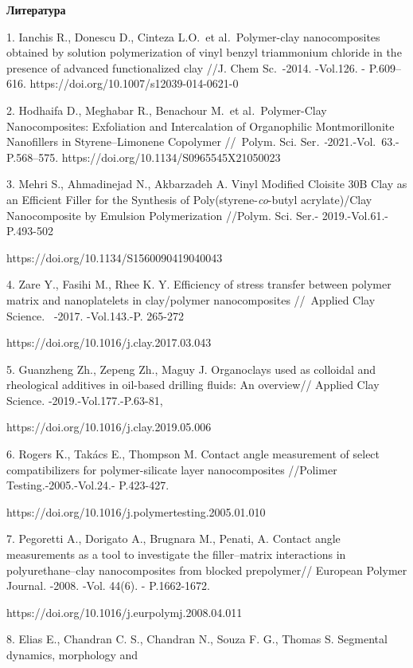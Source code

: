 \begin{center}
{\bfseries Литература}
\end{center}

\begin{noparindent}
1. Ianchis R., Donescu D., Cinteza L.O.~et al\emph{.}~Polymer-clay
nanocomposites obtained by solution polymerization of vinyl benzyl
triammonium chloride in the presence of advanced functionalized clay
//J. Chem Sc.~-2014. -Vol.126. - P.609--616.
https://doi.org/10.1007/s12039-014-0621-0

2. Hodhaifa D., Meghabar R., Benachour M.~et al\emph{.}~Polymer-Clay
Nanocomposites: Exfoliation and Intercalation of Organophilic
Montmorillonite Nanofillers in Styrene--Limonene Copolymer //~Polym.
Sci. Ser\emph{. -}2021.-Vol.~63.- P.568--575.
https://doi.org/10.1134/S0965545X21050023

3. Mehri S., Ahmadinejad N., Akbarzadeh A. Vinyl Modified Cloisite 30B
Clay as an Efficient Filler for the Synthesis of
Poly(styrene-\emph{co}-butyl acrylate)/Clay Nanocomposite by Emulsion
Polymerization //Polym. Sci. Ser.- 2019.-Vol.61.-P.493-502

https://doi.org/10.1134/S1560090419040043

4. Zare Y., Fasihi M., Rhee K. Y. Efficiency of stress transfer between
polymer matrix and nanoplatelets in clay/polymer nanocomposites
//~Applied Clay Science.~ -2017. -Vol.143.-P. 265-272

https://doi.org/10.1016/j.clay.2017.03.043

5. Guanzheng Zh., Zepeng Zh., Maguy J. Organoclays used as colloidal and
rheological additives in oil-based drilling fluids: An overview//
Applied Clay Science. -2019.-Vol.177.-P.63-81,

https://doi.org/10.1016/j.clay.2019.05.006

6. Rogers K., Takács E., Thompson M. Contact angle measurement of select
compatibilizers for polymer-silicate layer nanocomposites //Polimer
Testing.-2005.-Vol.24.- P.423-427.

https://doi.org/10.1016/j.polymertesting.2005.01.010

7. Pegoretti A., Dorigato A., Brugnara M., Penati, A. Contact angle
measurements as a tool to investigate the filler--matrix interactions in
polyurethane--clay nanocomposites from blocked prepolymer// European
Polymer Journal. -2008. -Vol. 44(6). - P.1662-1672.~

https://doi.org/10.1016/j.eurpolymj.2008.04.011

8. Elias E., Chandran C. S., Chandran N., Souza F. G., Thomas
S. Segmental dynamics, morphology and


\end{noparindent}
